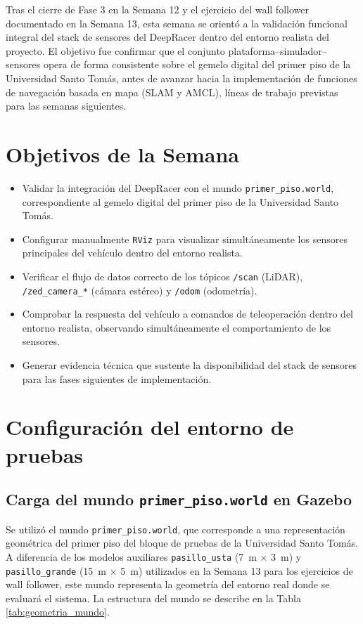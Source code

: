 \documentclass[12pt,letterpaper]{article}
\begin{document}
Tras el cierre de Fase 3 en la Semana 12 y el ejercicio del wall follower documentado en la Semana 13, esta semana se orientó a la validación funcional integral del stack de sensores del DeepRacer dentro del entorno realista del proyecto. El objetivo fue confirmar que el conjunto plataforma--simulador--sensores opera de forma consistente sobre el gemelo digital del primer piso de la Universidad Santo Tomás, antes de avanzar hacia la implementación de funciones de navegación basada en mapa (SLAM y AMCL), líneas de trabajo previstas para las semanas siguientes.

\section{Objetivos de la Semana}

\begin{itemize}
    \item Validar la integración del DeepRacer con el mundo \texttt{primer\_piso.world}, correspondiente al gemelo digital del primer piso de la Universidad Santo Tomás.
    \item Configurar manualmente \texttt{RViz} para visualizar simultáneamente los sensores principales del vehículo dentro del entorno realista.
    \item Verificar el flujo de datos correcto de los tópicos \texttt{/scan} (LiDAR), \texttt{/zed\_camera\_*} (cámara estéreo) y \texttt{/odom} (odometría).
    \item Comprobar la respuesta del vehículo a comandos de teleoperación dentro del entorno realista, observando simultáneamente el comportamiento de los sensores.
    \item Generar evidencia técnica que sustente la disponibilidad del stack de sensores para las fases siguientes de implementación.
\end{itemize}

\section{Configuración del entorno de pruebas}

\subsection{Carga del mundo \texttt{primer\_piso.world} en Gazebo}

Se utilizó el mundo \texttt{primer\_piso.world}, que corresponde a una representación geométrica del primer piso del bloque de pruebas de la Universidad Santo Tomás. A diferencia de los modelos auxiliares \texttt{pasillo\_usta} (7~m × 3~m) y \texttt{pasillo\_grande} (15~m × 5~m) utilizados en la Semana 13 para los ejercicios de wall follower, este mundo representa la geometría del entorno real donde se evaluará el sistema. La estructura del mundo se describe en la Tabla \ref{tab:geometria_mundo}.
\end{document}
